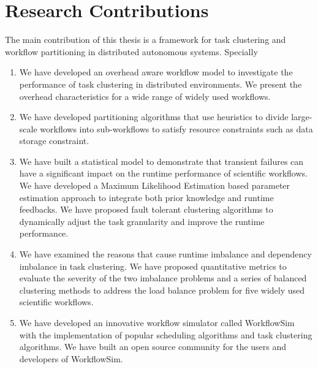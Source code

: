 \section{Research Contributions}

The main contribution of this thesis is a framework for task clustering and workflow partitioning in distributed autonomous systems. Specially
\begin{enumerate}
\item We have developed an overhead aware workflow model to investigate the performance of task clustering in distributed environments. We present the overhead characteristics for a wide range of widely used workflows.
\item We have developed partitioning algorithms that use heuristics to divide large-scale workflows into sub-workflows to satisfy resource constraints such as data storage constraint. 
\item We have built a statistical model to demonstrate that transient failures can have a significant impact on the runtime performance of scientific workflows. We have developed a Maximum Likelihood Estimation based parameter estimation approach to integrate both prior knowledge and runtime feedbacks. We have proposed fault tolerant clustering algorithms to dynamically adjust the task granularity and improve the runtime performance. 
\item We have examined the reasons that cause runtime imbalance and dependency imbalance in task clustering. We have proposed quantitative metrics to evaluate the severity of the two imbalance problems and a series of balanced clustering methods to address the load balance problem for five widely used scientific workflows. 
\item We have developed an innovative workflow simulator called WorkflowSim with the implementation of popular scheduling algorithms and task clustering algorithms. 
We have built an open source community for the users and developers of WorkflowSim. 
\end{enumerate}
 

